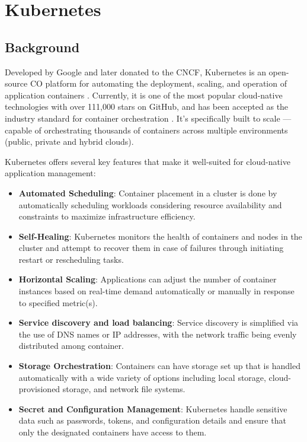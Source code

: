\section{Kubernetes}\label{kubernetes}
\subsection{Background}

Developed by Google and later donated to the CNCF, Kubernetes is an open-source CO platform for automating the deployment, scaling, and operation of application containers \cite{Kubernetes}. Currently, it is one of the most popular cloud-native technologies with over 111,000 stars on GitHub, and has been accepted as the industry standard for container orchestration \cite{truyenComprehensiveFeatureComparison2019, KubernetesKubernetesProductionGrade}. It's specifically built to scale — capable of orchestrating thousands of containers across multiple environments (public, private and hybrid clouds).

Kubernetes offers several key features that make it well-suited for cloud-native application management:

\begin{itemize}

\item \textbf{Automated Scheduling}: Container placement in a cluster is done by automatically scheduling workloads considering resource availability and constraints to maximize infrastructure efficiency. 

\item \textbf{Self-Healing}: Kubernetes monitors the health of containers and nodes in the cluster and attempt to recover them in case of failures through initiating restart or rescheduling tasks.

\item \textbf{Horizontal Scaling}: Applications can adjust the number of container instances based on real-time demand automatically or manually in response to specified metric(s).

\item \textbf{Service discovery and load balancing}: Service discovery is simplified via the use of DNS names or IP addresses, with the network traffic being evenly distributed among container.

\item \textbf{Storage Orchestration}: Containers can have storage set up that is handled automatically with a wide variety of options including local storage, cloud-provisioned storage, and network file systems.

\item \textbf{Secret and Configuration Management}: Kubernetes handle sensitive data such as passwords, tokens, and configuration details and ensure that only the designated containers have access to them. 

\end{itemize}

